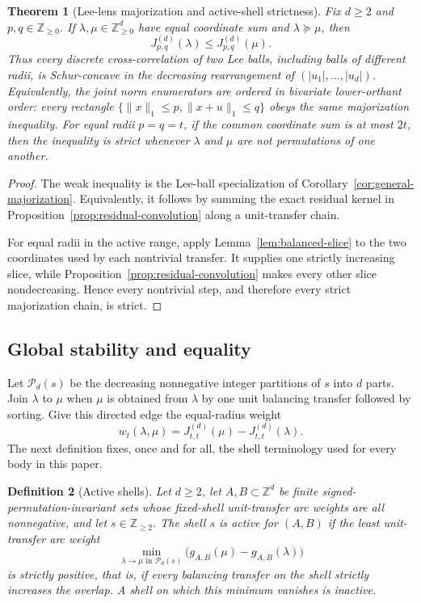 \documentclass[pdflatex,sn-mathphys-num]{sn-jnl}
\theoremstyle{thmstyleone}
\newtheorem{theorem}{Theorem}[section]
\theoremstyle{thmstylethree}
\newtheorem{definition}[theorem]{Definition}
\theoremstyle{thmstyletwo}
\newcommand{\Z}{\mathbb Z}
\begin{document}
\begin{theorem}[Lee-lens majorization and active-shell strictness]
\label{thm:cross-majorization}
Fix $d\ge2$ and $p,q\in\Z_{\ge0}$.  If $\lambda,\mu\in\Z_{\ge0}^d$ have equal coordinate sum
and $\lambda\succeq\mu$, then
\begin{equation}
 J_{p,q}^{(d)}(\lambda)\le J_{p,q}^{(d)}(\mu).     \label{eq:cross-schur}
\end{equation}
Thus every discrete cross-correlation of two Lee balls, including balls of
different radii, is Schur-concave in the decreasing rearrangement of
$(|u_1|,\ldots,|u_d|)$.
Equivalently, the joint norm enumerators are ordered in bivariate
lower-orthant order: every rectangle
$\{\|x\|_1\le p,\|x+u\|_1\le q\}$ obeys the same majorization inequality.
For equal radii $p=q=t$, if the common coordinate sum is at most $2t$, then
the inequality is strict whenever $\lambda$ and $\mu$ are not permutations
of one another.
\end{theorem}

\begin{proof}
The weak inequality is the Lee-ball specialization of
Corollary~\ref{cor:general-majorization}.  Equivalently, it follows by summing
the exact residual kernel in Proposition~\ref{prop:residual-convolution} along
a unit-transfer chain.

For equal radii in the active range, apply
Lemma~\ref{lem:balanced-slice} to the two coordinates used by each
nontrivial transfer.  It supplies one
strictly increasing slice, while Proposition~\ref{prop:residual-convolution}
makes every other slice nondecreasing.  Hence every nontrivial step, and
therefore every strict majorization chain, is strict.
\end{proof}

\subsection{Global stability and equality}
\label{sec:stability}

Let $\mathcal P_d(s)$ be the decreasing nonnegative integer partitions of
$s$ into $d$ parts.  Join $\lambda$ to $\mu$ when $\mu$ is obtained from
$\lambda$ by one unit balancing transfer followed by sorting.  Give this
directed edge the equal-radius weight
\[
 w_t(\lambda,\mu)=J_{t,t}^{(d)}(\mu)-J_{t,t}^{(d)}(\lambda).
\]
The next definition fixes, once and for all, the shell terminology used for
every body in this paper.

\begin{definition}[Active shells]
\label{def:active-shell}
Let $d\ge2$, let $A,B\subset\Z^d$ be finite signed-permutation-invariant sets whose
fixed-shell unit-transfer arc weights are all nonnegative, and let
$s\in\Z_{\ge2}$.  The shell $s$ is \emph{active} for $(A,B)$ if the least
unit-transfer arc weight
\[
 \min_{\lambda\to\mu\text{ in }\mathcal P_d(s)}
 \bigl(g_{A,B}(\mu)-g_{A,B}(\lambda)\bigr)
\]
is strictly positive, that is, if every balancing transfer on the shell
strictly increases the overlap.  A shell on which this minimum vanishes is
\emph{inactive}.
\end{definition}
\end{document}
